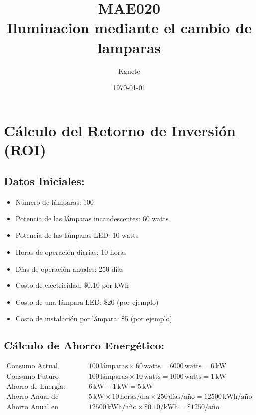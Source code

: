 \documentclass{article}
\title{MAE020 \\ Iluminacion mediante el cambio de lamparas}
\author{Kgnete}
\date{\today}
\begin{document}
\maketitle

\section*{Cálculo del Retorno de Inversión (ROI)}

\subsection*{Datos Iniciales:}
\begin{itemize}
    \item Número de lámparas: 100
    \item Potencia de las lámparas incandescentes: 60 watts
    \item Potencia de las lámparas LED: 10 watts
    \item Horas de operación diarias: 10 horas
    \item Días de operación anuales: 250 días
    \item Costo de electricidad: \$0.10 por kWh
    \item Costo de una lámpara LED: \$20 (por ejemplo)
    \item Costo de instalación por lámpara: \$5 (por ejemplo)
\end{itemize}


\subsection*{Cálculo de Ahorro Energético:}
\begin{align*}
\text{Consumo Actual (Incandescentes):} & \quad 100 \, \text{lámparas} \times 60 \, \text{watts} = 6000 \, \text{watts} = 6 \, \text{kW} \\
\text{Consumo Futuro (LED):} & \quad 100 \, \text{lámparas} \times 10 \, \text{watts} = 1000 \, \text{watts} = 1 \, \text{kW} \\
\text{Ahorro de Energía:} & \quad 6 \, \text{kW} - 1 \, \text{kW} = 5 \, \text{kW} \\
\text{Ahorro Anual de Energía:} & \quad 5 \, \text{kW} \times 10 \, \text{horas/día} \times 250 \, \text{días/año} = 12500 \, \text{kWh/año} \\
\text{Ahorro Anual en Costos:} & \quad 12500 \, \text{kWh/año} \times \$0.10/\text{kWh} = \$1250/\text{año}
\end{align*}
\end{document}
